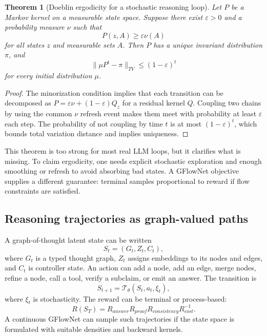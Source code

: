 \documentclass[11pt]{article}
\newtheorem{theorem}[definition]{Theorem}
\newcommand{\1}{\mathbf{1}}
\newcommand{\eps}{\varepsilon}
\begin{document}
\begin{theorem}[Doeblin ergodicity for a stochastic reasoning loop]
Let $P$ be a Markov kernel on a measurable state space. Suppose there exist $\eps>0$ and a probability measure $\nu$ such that
\[
P(z,A)\ge \eps\nu(A)
\]
for all states $z$ and measurable sets $A$. Then $P$ has a unique invariant distribution $\pi$, and
\[
\|\mu P^t-\pi\|_{TV}\le (1-\eps)^t
\]
for every initial distribution $\mu$.
\end{theorem}
\begin{proof}
The minorization condition implies that each transition can be decomposed as $P=\eps \nu +(1-\eps)Q_z$ for a residual kernel $Q$. Coupling two chains by using the common $\nu$ refresh event makes them meet with probability at least $\eps$ each step. The probability of not coupling by time $t$ is at most $(1-\eps)^t$, which bounds total variation distance and implies uniqueness.
\end{proof}

This theorem is too strong for most real LLM loops, but it clarifies what is missing. To claim ergodicity, one needs explicit stochastic exploration and enough smoothing or refresh to avoid absorbing bad states. A GFlowNet objective supplies a different guarantee: terminal samples proportional to reward if flow constraints are satisfied.

\subsection{Reasoning trajectories as graph-valued paths}

A graph-of-thought latent state can be written
\[
S_t=(G_t,Z_t,C_t),
\]
where $G_t$ is a typed thought graph, $Z_t$ assigns embeddings to its nodes and edges, and $C_t$ is controller state. An action can add a node, add an edge, merge nodes, refine a node, call a tool, verify a subclaim, or emit an answer. The transition is
\[
S_{t+1}=\mathcal{T}_\theta(S_t,a_t,\xi_t),
\]
where $\xi_t$ is stochasticity. The reward can be terminal or process-based:
\[
R(S_T)=R_{answer}R_{proof}R_{consistency}R_{cost}^{-1}.
\]
A continuous GFlowNet can sample such trajectories if the state space is formulated with suitable densities and backward kernels.
\end{document}

